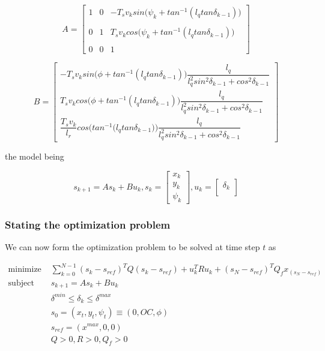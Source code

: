 \begin{equation}
  A =
  \begin{bmatrix}
    1 & 0 & -T_s v_k sin\Big(\psi_k + tan^{-1} (l_q tan\delta_{k-1})\Big) \\\\
    0 & 1 & T_s v_k cos\Big(\psi_k + tan^{-1} (l_q tan\delta_{k-1})\Big) \\\\
    0 & 0 & 1
  \end{bmatrix}
\end{equation}

\begin{equation}
  B =
  \begin{bmatrix}
    -T_s v_k sin\Big(\phi + tan^{-1} (l_q tan\delta_{k-1})\Big) \dfrac{l_q}{l_q^2 sin^2\delta_{k-1} + cos^2\delta_{k-1}} \\
    T_s v_k cos\Big(\phi + tan^{-1} (l_q tan\delta_{k-1})\Big) \dfrac{l_q}{l_q^2 sin^2\delta_{k-1} + cos^2\delta_{k-1}} \\
    \dfrac{T_s v_k}{l_r} cos\Bigg(tan^{-1} \Big(l_q tan\delta_{k-1}\Big)\Bigg) \dfrac{l_q}{l_q^2 sin^2\delta_{k-1} + cos^2\delta_{k-1}}
  \end{bmatrix}
\end{equation}

the model being

\begin{equation}
  s_{k+1} = A s_k + B u_k,
  s_k=
  \begin{bmatrix}
    x_{k} \\
    y_{k} \\
    \psi_{k}
  \end{bmatrix},
  u_k=
  \begin{bmatrix}
    \delta_{k}\\
  \end{bmatrix}
\end{equation}



\subsubsection{Stating the optimization problem}

We can now form the optimization problem to be solved at time step $t$ as

\begin{align}
  \text{minimize }    & \sum\limits_{k=0}^{N-1} (s_k - s_{ref})^T Q (s_k - s_{ref}) + u_k^T R u_k + (s_N-s_{ref})^T Q_f x_(s_N-s_{ref}) \\
  \text{subject to }  & s_{k+1} = A s_k + B u_k \\
                      & \delta^{min} \leq \delta_k \leq \delta^{max} \\
                      & s_0 = (x_t, y_t, \psi_t) \equiv (0, OC, \phi)\\
                      & s_{ref} = (x^{max}, 0, 0)\\
                      & Q > 0, R > 0, Q_f > 0
\end{align}
